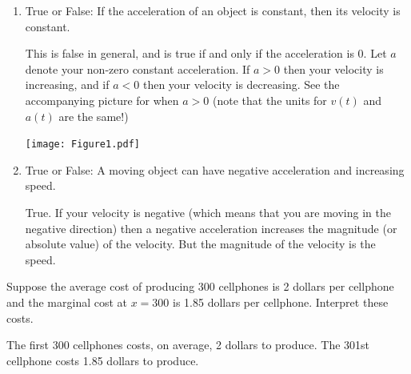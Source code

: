 \documentclass[nooutcomes]{ximera}
\begin{document}
\begin{problem}	
	\begin{enumerate}
	
	\item  True or False:  If the acceleration of an object is constant, then its velocity is constant.

		\begin{freeResponse}
		This is false in general, and is true if and only if the acceleration is 0.  Let $a$ denote your non-zero constant acceleration.  If $a > 0$ then your velocity is increasing, and if $a < 0$ then your velocity is decreasing.  See the accompanying picture for when $a>0$ (note that the units for $v(t)$ and $a(t)$ are  the same!)
		
			\begin{image}
			\texttt{[image: Figure1.pdf]}
			\end{image}
		\end{freeResponse}	
		
		
	
	\item  True or False:  A moving object can have negative acceleration and increasing speed.

		\begin{freeResponse}
		True.  If your velocity is negative (which means that you are moving in the negative direction) then a negative acceleration increases the magnitude (or absolute value) of the velocity.  But the magnitude of the velocity is the speed.
		\end{freeResponse}	
		
		
		
	\end{enumerate}
	
	
\end{problem}	
	
\begin{problem}
Suppose the average cost of producing 300 cellphones is 2 dollars per cellphone and the marginal cost at $x=300$ is 1.85 dollars per cellphone.  Interpret these costs.

	\begin{freeResponse}
		The first 300 cellphones costs, on average, 2 dollars to produce.  The 301st cellphone costs 1.85 dollars to produce.
	\end{freeResponse}

\end{problem}
	
\end{document}
